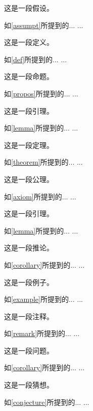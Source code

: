 \begin{assumption}
这是一段假设。
\label{assumpt}
\end{assumption}
如\cref{assumpt}所提到的... ...


\begin{definition}
这是一段定义。
\label{def}
\end{definition}
如\cref{def}所提到的... ...

\begin{proposition}
这是一段命题。
\label{propos}
\end{proposition}
如\cref{propos}所提到的... ...


\begin{lemma}
这是一段引理。
\label{lemma}
\end{lemma}
如\cref{lemma}所提到的... ...

\begin{theorem}
这是一段定理。
\label{theorem}
\end{theorem}
如\cref{theorem}所提到的... ...


\begin{axiom}
这是一段公理。
\label{axiom}
\end{axiom}
如\cref{axiom}所提到的... ...

\begin{lemma}
这是一段引理。
\label{lemma}
\end{lemma}
如\cref{lemma}所提到的... ...

\begin{corollary}
这是一段推论。
\label{corollary}
\end{corollary}
如\cref{corollary}所提到的... ...


\begin{example}
这是一段例子。
\label{example}
\end{example}
如\cref{example}所提到的... ...

\begin{remark}
这是一段注释。
\label{remark}
\end{remark}
如\cref{remark}所提到的... ...

\begin{problem}
这是一段问题。
\label{problem}
\end{problem}
如\cref{corollary}所提到的... ...


\begin{conjecture}
这是一段猜想。
\label{conjecture}
\end{conjecture}
如\cref{conjecture}所提到的... ...
